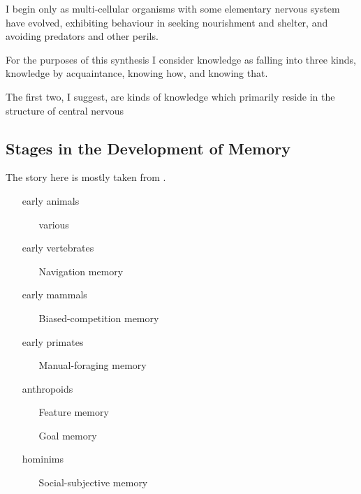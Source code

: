 \documentclass[10pt,titlepage]{book}
\begin{document}
I begin only as multi-cellular organisms with some elementary nervous system have evolved, exhibiting behaviour in seeking nourishment and shelter, and avoiding predators and other perils.

For the purposes of this synthesis I consider knowledge as falling into three kinds, knowledge by acquaintance, knowing how, and knowing that.

The first two, I suggest, are kinds of knowledge which primarily reside in the structure of central nervous

\subsection{Stages in the Development of Memory}

The story here is mostly taken from \cite{murray2017evolution}.

\begin{itemize}
\item[early animals]
  
  \begin{itemize}
\item[]
\item[various]
  \end{itemize}

\item[early vertebrates]
  
  \begin{itemize}
\item[]
\item[Navigation memory]
  \end{itemize}
 
\item[early mammals]
  
  \begin{itemize}
\item[]
\item[Biased-competition memory]
  \end{itemize}
 
\item[early primates]
  
  \begin{itemize}
\item[]
\item[Manual-foraging memory]
  \end{itemize}
 
\item[anthropoids]
  
  \begin{itemize}
\item[]
\item[Feature memory]
\item[Goal memory]
  \end{itemize}
  
\item[hominims]
  
  \begin{itemize}
\item[]
\item[Social-subjective memory]
  \end{itemize}
  \end{itemize}
\end{document}
